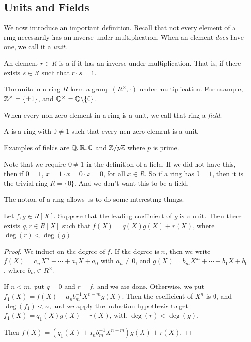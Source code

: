 \documentclass[a4paper]{scrartcl}
\begin{document}
\subsection{Units and Fields}

We now introduce an important definition. Recall that not every element of a ring necessarily has an inverse under multiplication. When an element \emph{does} have one, we call it a \emph{unit}.

\begin{definition}[Unit]
	An element $r \in R$ is a  if it has an inverse under multiplication. That is, if there exists $s \in R$ such that $r\cdot s = 1$.
\end{definition}

The units in a ring $R$ form a group $(R^\times, \cdot)$ under multiplication. For example, $\mathbb{Z}^\times = \{\pm 1\}$, and $\mathbb{Q}^\times = \mathbb{Q} \backslash \{0\}$.

When every non-zero element in a ring is a unit, we call that ring a \emph{field}.

\begin{definition}[Field]
	A  is a ring with $0 \neq 1$ such that every non-zero element is a unit.
\end{definition}

Examples of fields are $\mathbb{Q}, \mathbb{R}, \mathbb{C}$ and $\mathbb{Z}/p\mathbb{Z}$ where $p$ is prime.

\begin{remark}
	Note that we require $0 \neq 1$ in the definition of a field. If we did not have this, then if $0 = 1$, $x = 1 \cdot x = 0 \cdot x = 0$, for all $x \in R$. So if a ring has $0 = 1$, then it is the trivial ring $R = \{0\}$. And we don't want this to be a field.
\end{remark}

The notion of a ring allows us to do some interesting things.

\begin{lemma}
	Let $f, g \in R[X]$. Suppose that the leading coefficient of $g$ is a unit. Then there exists $q, r \in R[X]$ such that $f(X) = q(X) g(X) + r(X)$, where $\deg(r) < \deg(g)$.
\end{lemma}
\begin{proof}
	We induct on the degree of $f$. If the degree is $n$, then we write $f(X) = a_n X^n + \cdots + a_1 X + a_0$ with $a_n \neq 0$, and $g(X) = b_m X^m + \cdots + b_1  X + b_0$, where $b_m \in R^\times$.

	If $n < m$, put $q = 0$ and $r = f$, and we are done. Otherwise, we put $f_1(X) = f(X) - a_n b_m^{-1}X^{n - m}g(X)$. Then the coefficient of $X^n$ is $0$, and $\deg(f_1) < n$, and we apply the induction hypothesis to get $f_1(X) = q_1(X)g(X) + r(X)$, with $\deg(r) < \deg(g)$.

	Then $f(X) =(q_1(X) + a_n b_{m}^{-1} X^{n - m})g(X) + r(X)$.
\end{proof}
\end{document}
